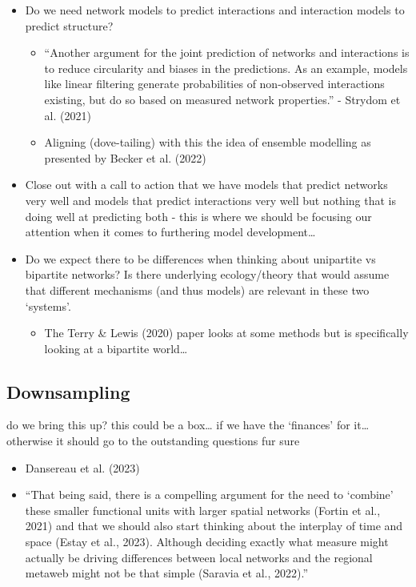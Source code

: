 \documentclass[
]{article}
\providecommand{\tightlist}{%
  \setlength{\itemsep}{0pt}\setlength{\parskip}{0pt}}\usepackage{longtable,booktabs,array}
\begin{document}
\begin{itemize}
\item
  Do we need network models to predict interactions and interaction
  models to predict structure?

  \begin{itemize}
  \item
    ``Another argument for the joint prediction of networks and
    interactions is to reduce circularity and biases in the predictions.
    As an example, models like linear filtering generate probabilities
    of non-observed interactions existing, but do so based on measured
    network properties.'' - Strydom et al. (2021)
  \item
    Aligning (dove-tailing) with this the idea of ensemble modelling as
    presented by Becker et al. (2022)
  \end{itemize}
\item
  Close out with a call to action that we have models that predict
  networks very well and models that predict interactions very well but
  nothing that is doing well at predicting both - this is where we
  should be focusing our attention when it comes to furthering model
  development\ldots{}
\item
  Do we expect there to be differences when thinking about unipartite vs
  bipartite networks? Is there underlying ecology/theory that would
  assume that different mechanisms (and thus models) are relevant in
  these two `systems'.

  \begin{itemize}
  \tightlist
  \item
    The Terry \& Lewis (2020) paper looks at some methods but is
    specifically looking at a bipartite world\ldots{}
  \end{itemize}
\end{itemize}

\subsection{Downsampling}\label{downsampling}

do we bring this up? this could be a box\ldots{} if we have the
`finances' for it\ldots{} otherwise it should go to the outstanding
questions fur sure

\begin{itemize}
\item
  Dansereau et al. (2023)
\item
  ``That being said, there is a compelling argument for the need to
  `combine' these smaller functional units with larger spatial networks
  (Fortin et al., 2021) and that we should also start thinking about the
  interplay of time and space (Estay et al., 2023). Although deciding
  exactly what measure might actually be driving differences between
  local networks and the regional metaweb might not be that simple
  (Saravia et al., 2022).''
\end{itemize}
\end{document}
